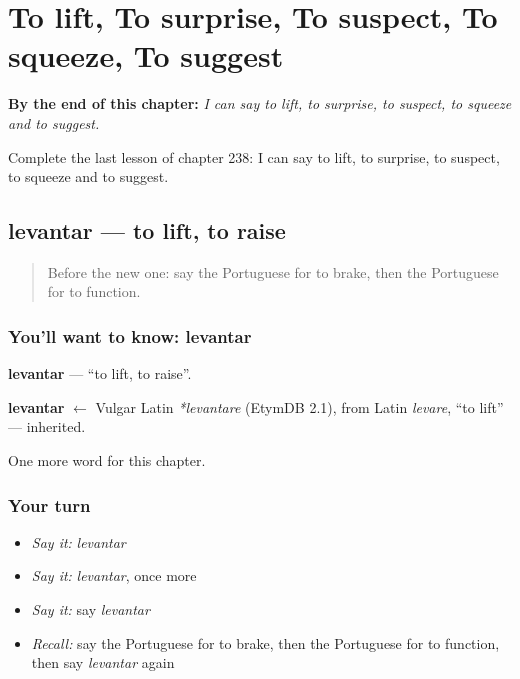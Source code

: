 
\chapter{To lift, To surprise, To suspect, To squeeze, To suggest}
\label{ch:pt-to-lift-to-surprise-to-suspect-to-squeeze-to-suggest}

\begin{chapteropening}
\textbf{By the end of this chapter:} \emph{I can say to lift, to surprise, to suspect, to squeeze and to suggest.}

Complete the last lesson of chapter 238: I can say to lift, to surprise, to suspect, to squeeze and to suggest.
\end{chapteropening}

\section[levantar]{levantar — to lift, to raise}

\label{lesson:PT-C238-levantar}



\begin{quote}
Before the new one: say the Portuguese for to brake, then the Portuguese for to function.
\end{quote}

\subsection*{You'll want to know: levantar}
\textbf{levantar} — \textquotedblleft{}to lift, to raise\textquotedblright{}.

\begin{cousinweb}
\textbf{levantar} $\leftarrow$ Vulgar Latin \emph{*levantare} (EtymDB 2.1), from Latin \emph{levare}, \textquotedblleft{}to lift\textquotedblright{} — inherited.
\end{cousinweb}

\begin{grammarlens}[title={What you've built}]
One more word for this chapter.
\end{grammarlens}

\subsection*{Your turn}
\begin{itemize}
\raggedright
  \item \emph{Say it:} \emph{levantar}
  \item \emph{Say it:} \emph{levantar}, once more
  \item \emph{Say it:} say \emph{levantar}
  \item \emph{Recall:} say the Portuguese for to brake, then the Portuguese for to function, then say \emph{levantar} again
\end{itemize}


